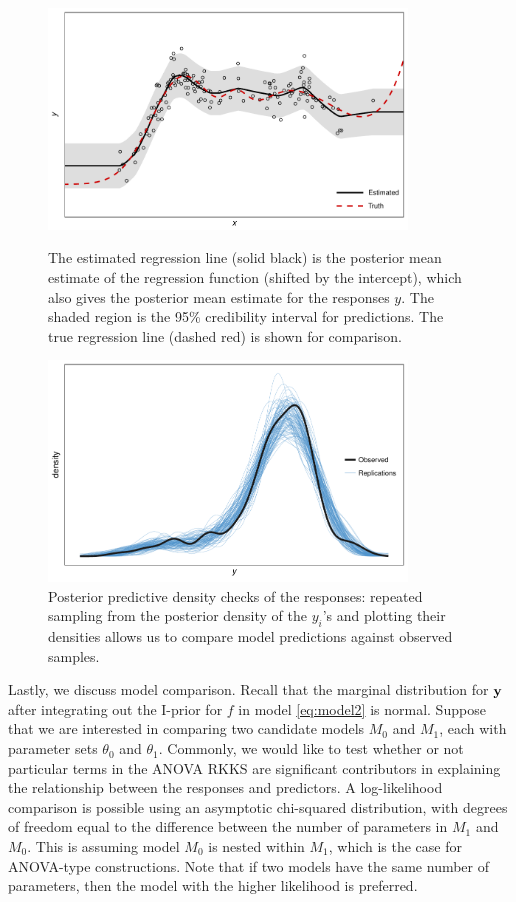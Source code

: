\begin{figure}[p]
  \centering
  \includegraphics[width=0.85\textwidth]{figure/04-post_reg_cred}
  \caption[Posterior regression and credibility intervals]{The estimated regression line (solid black) is the posterior mean estimate of the regression function (shifted by the intercept), which also gives the posterior mean estimate for the responses $y$. The shaded region is the 95\% credibility interval for predictions. The true regression line (dashed red) is shown for comparison.}
  \vspace{1em}
  \includegraphics[width=0.85\textwidth]{figure/04-post_reg_ppc}
  \caption[Posterior predictive density check]{Posterior predictive density checks of the responses: repeated sampling from the posterior density of the $y_i$'s and plotting their densities allows us to compare model predictions against observed samples.}
\end{figure}

Lastly, we discuss model comparison.
Recall that the marginal distribution for ${\mathbf y}$ after integrating out the I-prior for $f$ in model \cref{eq:model2} is normal.
Suppose that we are interested in comparing two candidate models $M_0$ and $M_1$, each with parameter sets $\theta_0$ and $\theta_1$.
Commonly, we would like to test whether or not particular terms in the ANOVA RKKS are significant contributors in explaining the relationship between the responses and predictors.
A log-likelihood comparison is possible using an asymptotic chi-squared distribution, with degrees of freedom equal to the difference between the number of parameters in $M_1$ and $M_0$.
This is assuming model $M_0$ is nested within $M_1$, which is the case for ANOVA-type constructions.
Note that if two models have the same number of parameters, then the model with the higher likelihood is preferred.

